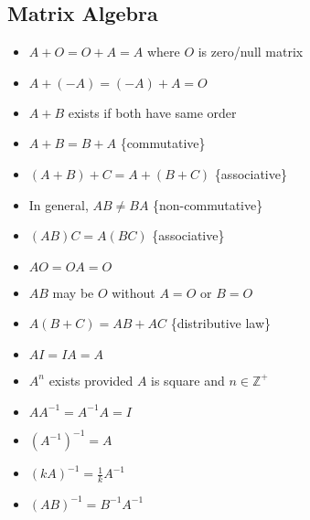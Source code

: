 \documentclass[10pt, a4paper, titlepage]{article}
\begin{document}
\begin{multicols*}{3}
\subsection{Matrix Algebra}
\begin{itemize}
	\item $A+O=O+A=A$ where $O$ is zero/null matrix
	\item $A+(-A)=(-A)+A=O$
	\item $A+B$ exists if both have same order
	\item $A+B=B+A$ \{commutative\}
	\item $(A+B)+C=A+(B+C)$ \{associative\}
	\item In general, $AB\neq BA$ \{non-commutative\}
	\item $(AB)C=A(BC)$ \{associative\}
	\item $AO=OA=O$
	\item $AB$ may be $O$ without $A=O$ or $B=O$
	\item $A(B+C)=AB+AC$ \{distributive law\}
	\item $AI=IA=A$
	\item $A^n$ exists provided $A$ is square and $n\in \mathbb{Z}^+$
	\item $AA^{-1}=A^{-1}A=I$
	\item $(A^{-1})^{-1}=A$
	\item $(kA)^{-1}=\frac{1}{k}A^{-1}$
	\item $(AB)^{-1}=B^{-1}A^{-1}$
\end{itemize}
\dotfill

\end{multicols*}
\end{document}
